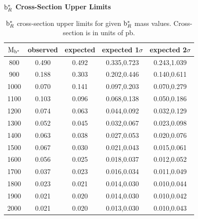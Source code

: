 \clearpage

\begin{table}[htcb]
\begin{center}
\bf{$\mathrm{b}^{*}_{R}$ Cross-Section Upper Limits}\\
\begin{tabular}{c||c|c|c|c}
\hline\hline
\bf{$\mathrm{M_{\mathrm{b}^{*}}}$} & \bf{observed}  & \bf{expected} & \bf{expected 1$\sigma$}  & \bf{expected 2$\sigma$} \\
\hline
\hline
800 & 0.490 & 0.492 & 0.335,0.723 & 0.243,1.039\\ 
900 & 0.188 & 0.303 & 0.202,0.446 & 0.140,0.611\\ 
1000 & 0.070 & 0.141 & 0.097,0.203 & 0.070,0.279\\ 
1100 & 0.103 & 0.096 & 0.068,0.138 & 0.050,0.186\\ 
1200 & 0.074 & 0.063 & 0.044,0.092 & 0.032,0.129\\ 
1300 & 0.052 & 0.045 & 0.032,0.067 & 0.023,0.098\\ 
1400 & 0.063 & 0.038 & 0.027,0.053 & 0.020,0.076\\ 
1500 & 0.067 & 0.030 & 0.021,0.043 & 0.015,0.061\\
1600 & 0.056 & 0.025 & 0.018,0.037 & 0.012,0.052\\ 
1700 & 0.037 & 0.023 & 0.016,0.034 & 0.011,0.049\\ 
1800 & 0.023 & 0.021 & 0.014,0.030 & 0.010,0.044\\ 
1900 & 0.021 & 0.020 & 0.014,0.030 & 0.010,0.042\\ 
2000 & 0.021 & 0.020 & 0.013,0.030 & 0.010,0.043\\ 
\hline
\end{tabular}
\end{center}
\caption{$\mathrm{b}^{*}_R$ cross-section upper limits for given $\mathrm{b}^{*}_R$ mass values.  Cross-section is in units of pb.}
\label{table:bsupperxsecR}
\end{table}



